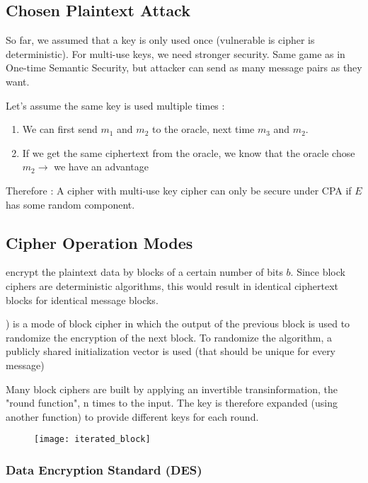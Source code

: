 \subsection{Chosen Plaintext Attack}

So far, we assumed that a key is only used once (vulnerable is cipher is deterministic). For multi-use keys, we need stronger security. Same game as in One-time Semantic Security, but attacker can send as many message pairs as they want.

Let's assume the same key is used multiple times :
\begin{enumerate}
    \item We can first send $m_1$ and $m_2$ to the oracle, next time $m_3$ and $m_2$.
    \item If we get the same ciphertext from the oracle, we know that the oracle chose $m_2 \rightarrow$ we have an advantage
\end{enumerate}

Therefore : A cipher with multi-use key cipher can only be secure under CPA if $E$ has some random component.

\subsection{Cipher Operation Modes}

 encrypt the plaintext data by blocks of a certain number of bits $b$. Since block ciphers are deterministic algorithms, this would result in identical ciphertext blocks for identical message blocks.

 ) is a mode of block cipher in which the output of the previous block is used to randomize the encryption of the next block. To randomize the algorithm, a publicly shared initialization vector is used (that should be unique for every message)

Many block ciphers are built by applying an invertible transinformation, the "round function", n times to the input. The key is therefore expanded (using another function) to provide different keys for each round.
\begin{figure}[H]
    \centering
    \texttt{[image: iterated\_block]}
\end{figure}

\subsubsection{Data Encryption Standard (DES)}

